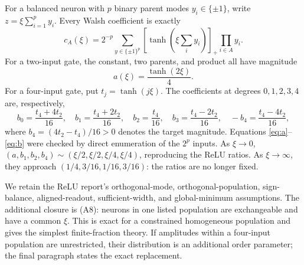 \documentclass[10pt]{article}
\begin{document}
For a balanced neuron with $p$ binary parent modes $y_i\in\{\pm1\}$, write
$z=\xi\sum_{i=1}^{p}y_i$.  Every Walsh coefficient is exactly
\begin{equation}
c_A(\xi)=2^{-p}\sum_{y\in\{\pm1\}^p}
\left[\tanh\!\left(\xi\sum_i y_i\right)\right]_+
\prod_{i\in A}y_i.
\label{eq:walsh}
\end{equation}
For a two-input gate, the constant, two parents, and product all have magnitude
\begin{equation}
a(\xi)=\frac{\tanh(2\xi)}4.
\label{eq:a}
\end{equation}
For a four-input gate, put $t_j=\tanh(j\xi)$.  The coefficients at degrees
$0,1,2,3,4$ are, respectively,
\begin{equation}
b_0=\frac{t_4+4t_2}{16},\quad
b_1=\frac{t_4+2t_2}{16},\quad
b_2=\frac{t_4}{16},\quad
b_3=\frac{t_4-2t_2}{16},\quad
-b_4=\frac{t_4-4t_2}{16},
\label{eq:b}
\end{equation}
where $b_4=(4t_2-t_4)/16>0$ denotes the target magnitude.  Equations
\eqref{eq:a}--\eqref{eq:b} were checked by direct enumeration of the $2^p$ inputs.  As
$\xi\to0$, $(a,b_1,b_2,b_4)\sim(\xi/2,\xi/2,\xi/4,\xi/4)$, reproducing the ReLU
ratios.  As $\xi\to\infty$, they approach $(1/4,3/16,1/16,3/16)$: the ratios are no
longer fixed.

We retain the ReLU report's orthogonal-mode, orthogonal-population, sign-balance,
aligned-readout, sufficient-width, and global-minimum assumptions.  The additional closure
is (A8): neurons in one listed population are exchangeable and have a common $\xi$.  This is
exact for a constrained homogeneous population and gives the simplest finite-fraction
theory.  If amplitudes within a four-input population are unrestricted, their distribution is
an additional order parameter; the final paragraph states the exact replacement.
\end{document}
